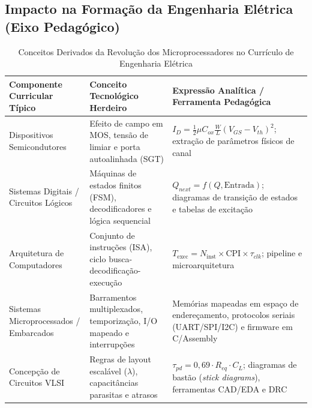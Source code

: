 \subsection{Impacto na Formação da Engenharia Elétrica (Eixo Pedagógico)}
\label{subsec:impacto_curricular}

\begin{table}[t]
\caption{Conceitos Derivados da Revolução dos Microprocessadores no Currículo de Engenharia Elétrica}
\label{tab:curriculo_microprocessadores}
\centering
\begin{tabularx}{\textwidth}{p{4.2cm} p{5.2cm} X}
\toprule
\textbf{Componente Curricular Típico} & \textbf{Conceito Tecnológico Herdeiro} & \textbf{Expressão Analítica / Ferramenta Pedagógica} \\
\midrule
Dispositivos Semicondutores & Efeito de campo em MOS, tensão de limiar e porta autoalinhada (SGT) & $I_D = \frac{1}{2}\mu C_{ox}\frac{W}{L}(V_{GS} - V_{th})^2$; extração de parâmetros físicos de canal \\
Sistemas Digitais / Circuitos Lógicos & Máquinas de estados finitos (FSM), decodificadores e lógica sequencial & $Q_{next} = f(Q, \text{Entrada})$; diagramas de transição de estados e tabelas de excitação \\
Arquitetura de Computadores & Conjunto de instruções (ISA), ciclo busca-decodificação-execução & $T_{\text{exec}} = N_{\text{inst}} \times \text{CPI} \times \tau_{clk}$; pipeline e microarquitetura \\
Sistemas Microprocessados / Embarcados & Barramentos multiplexados, temporização, I/O mapeado e interrupções & Memórias mapeadas em espaço de endereçamento, protocolos seriais (UART/SPI/I2C) e firmware em C/Assembly \\
Concepção de Circuitos VLSI & Regras de layout escalável ($\lambda$), capacitâncias parasitas e atrasos & $\tau_{pd} = 0{,}69 \cdot R_{eq} \cdot C_L$; diagramas de bastão (\textit{stick diagrams}), ferramentas CAD/EDA e DRC \\
\bottomrule
\end{tabularx}
\end{table}

